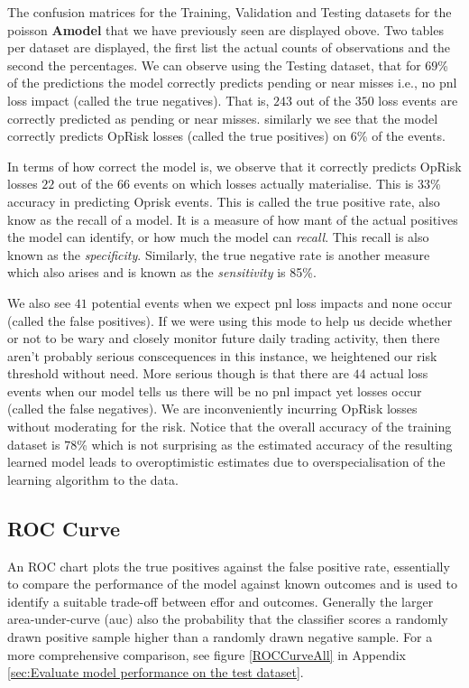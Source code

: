 \documentclass{DissertateUSU}
\begin{document}
The confusion matrices for the Training, Validation and Testing datasets
for the poisson \textbf{Amodel} that we have previously seen are
displayed obove. Two tables per dataset are displayed, the first list
the actual counts of observations and the second the percentages. We can
observe using the Testing dataset, that for \(69\)\% of the predictions
the model correctly predicts pending or near misses i.e., no pnl loss
impact (called the true negatives). That is, \(243\) out of the \(350\)
loss events are correctly predicted as pending or near misses. similarly
we see that the model correctly predicts OpRisk losses (called the true
positives) on \(6\)\% of the events.\medskip

In terms of how correct the model is, we observe that it correctly
predicts OpRisk losses \(22\) out of the \(66\) events on which losses
actually materialise. This is \(33\)\% accuracy in predicting Oprisk
events. This is called the true positive rate, also know as the recall
of a model. It is a measure of how mant of the actual positives the
model can identify, or how much the model can \emph{recall}. This recall
is also known as the \emph{specificity}. Similarly, the true negative
rate is another measure which also arises and is known as the
\emph{sensitivity} is 85\%.\medskip

We also see \(41\) potential events when we expect pnl loss impacts and
none occur (called the false positives). If we were using this mode to
help us decide whether or not to be wary and closely monitor future
daily trading activity, then there aren't probably serious conscequences
in this instance, we heightened our risk threshold without need. More
serious though is that there are \(44\) actual loss events when our
model tells us there will be no pnl impact yet losses occur (called the
false negatives). We are inconveniently incurring OpRisk losses without
moderating for the risk. Notice that the overall accuracy of the
training dataset is \(78\)\% which is not surprising as the estimated
accuracy of the resulting learned model leads to overoptimistic
estimates due to overspecialisation of the learning algorithm to the
data.

\singlespacing

\doublespacing

\subsection{ROC Curve}

An ROC chart plots the true positives against the false positive rate,
essentially to compare the performance of the model against known
outcomes and is used to identify a suitable trade-off between effor and
outcomes. Generally the larger area-under-curve (auc) also the
probability that the classifier scores a randomly drawn positive sample
higher than a randomly drawn negative sample. For a more comprehensive
comparison, see figure \ref{ROCCurveAll} in Appendix
\ref{sec:Evaluate model performance on the test dataset}.
\end{document}
